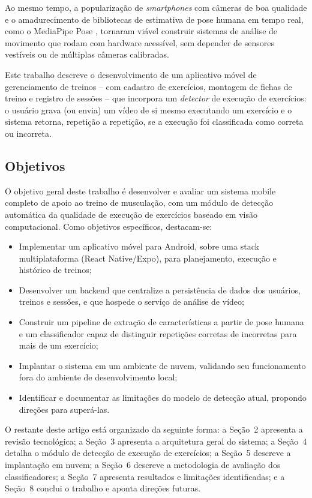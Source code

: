 \documentclass[12pt]{article}
\begin{document}
Ao mesmo tempo, a popularização de \textit{smartphones} com câmeras de boa
qualidade e o amadurecimento de bibliotecas de estimativa de pose humana em
tempo real, como o MediaPipe Pose \cite{lugaresi2019mediapipe,
bazarevsky2020blazepose}, tornaram viável construir sistemas de análise de
movimento que rodam com hardware acessível, sem depender de sensores
vestíveis ou de múltiplas câmeras calibradas.

Este trabalho descreve o desenvolvimento de um aplicativo móvel de
gerenciamento de treinos -- com cadastro de exercícios, montagem de fichas
de treino e registro de sessões -- que incorpora um
\textit{detector} de execução de exercícios: o usuário grava (ou envia) um
vídeo de si mesmo executando um exercício e o sistema retorna, repetição a
repetição, se a execução foi classificada como correta ou incorreta.

\subsection{Objetivos}

O objetivo geral deste trabalho é desenvolver e avaliar um sistema mobile
completo de apoio ao treino de musculação, com um módulo de detecção
automática da qualidade de execução de exercícios baseado em visão
computacional. Como objetivos específicos, destacam-se:

\begin{itemize}
  \item Implementar um aplicativo móvel para Android, sobre uma stack
  multiplataforma (React Native/Expo), para planejamento, execução e
  histórico de treinos;
  \item Desenvolver um backend que centralize a persistência de dados dos
  usuários, treinos e sessões, e que hospede o serviço de análise de vídeo;
  \item Construir um pipeline de extração de características a partir de
  pose humana e um classificador capaz de distinguir repetições corretas de
  incorretas para mais de um exercício;
  \item Implantar o sistema em um ambiente de nuvem, validando seu
  funcionamento fora do ambiente de desenvolvimento local;
  \item Identificar e documentar as limitações do modelo de detecção
  atual, propondo direções para superá-las.
\end{itemize}

O restante deste artigo está organizado da seguinte forma: a Seção~2
apresenta a revisão tecnológica; a Seção~3 apresenta a arquitetura geral do
sistema; a Seção~4 detalha o módulo de detecção de execução de exercícios;
a Seção~5 descreve a implantação em nuvem; a Seção~6 descreve a
metodologia de avaliação dos classificadores; a Seção~7 apresenta
resultados e limitações identificadas; e a Seção~8 conclui o trabalho e
aponta direções futuras.
\end{document}
